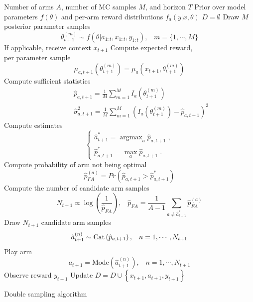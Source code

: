 \documentclass{article}
\newcommand{\Cat}[1]{{\rm Cat}\left( #1\right)}
\newcommand{\argmax}{\mathop{\mathrm{argmax}}}
\begin{document}
\begin{algorithm}
	\begin{algorithmic}[1]
		\REQUIRE Number of arms $A$, number of MC samples $M$, and horizon $T$
		\REQUIRE Prior over model parameters $f(\theta)$ and per-arm reward distributions $f_a(y|x,\theta)$
		\STATE $D=\emptyset$
		\STATE Draw $M$ posterior parameter samples
		\begin{equation}
		\theta_{t+1}^{(m)}\sim f(\theta|a_{1:t}, x_{1:t}, y_{1:t}), \; \; \; m=\{1, \cdots, M\}
		\end{equation}
		\STATE If applicable, receive context $x_{t+1}$
		\STATE Compute expected reward, \\
		\qquad \qquad per parameter sample
		\begin{equation}
		\mu_{a,t+1}(\theta_{t+1}^{(m)})=\mu_{a}(x_{t+1},\theta_{t+1}^{(m)})
		\end{equation}
		\STATE Compute sufficient statistics
		\begin{equation}
		\begin{split}
		&\qquad \; \; \hat{p}_{a,t+1}=\frac{1}{M}\sum_{m=1}^M I_a\left(\theta_{t+1}^{(m)}\right) \\
		&\qquad \; \; \hat{\sigma}^2_{a,t+1}=\frac{1}{M} \sum_{m=1}^M \left(I_a\left(\theta_{t+1}^{(m)}\right)- \hat{p}_{a,t+1} \right)^2
		\end{split}
		\end{equation}
		\ENDFOR
		\STATE Compute estimates
		\begin{equation}
		\begin{cases}
		\hat{a}_{t+1}^* =\argmax_{a} \hat{p}_{a,t+1} \; ,  \\
		\hat{p}^*_{a,t+1}=\max_{a} \hat{p}_{a,t+1} \; .
		\end{cases}
		\end{equation}
		\STATE Compute probability of arm not being optimal
		\begin{equation}
		\hat{p}_{FA}^{(a)}=Pr\left(\hat{p}_{a,t+1} > \hat{p}^*_{a,t+1} \right)
		\end{equation}
		\ENDFOR
		\STATE Compute the number of candidate arm samples
		\begin{equation}
		N_{t+1} \propto \log\left(\frac{1}{\hat{p}_{FA}}\right), \; \; \; \hat{p}_{FA}=\frac{1}{A-1}\sum_{a \neq \hat{a}_{t+1}^*}\hat{p}_{FA}^{(a)}
		\end{equation}
		\STATE Draw $N_{t+1}$ candidate arm samples
		\begin{equation}
		\hat{a}_{t+1}^{(n)} \sim \Cat{\hat{p}_{a,t+1}}, \; \; \; n=1,\cdots, N_{t+1} 
		\end{equation}
		\STATE Play arm
		\begin{equation}
		a_{t+1} = \text{Mode}\left(\hat{a}_{t+1}^{(n)}\right), \; \; \; n=1,\cdots,N_{t+1}
		\end{equation}
		\STATE Observe reward $y_{t+1}$
		\STATE Update $D=D \cup \left\{x_{t+1}, a_{t+1}, y_{t+1}\right\}$
		\ENDFOR
	\end{algorithmic}
	\caption{Double sampling algorithm}
	\label{alg:bayesianDoubleSampling}
\end{algorithm}
\end{document}
